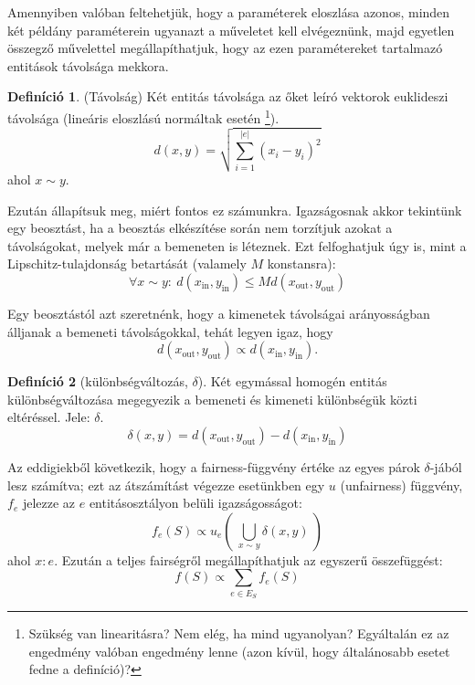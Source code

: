 \documentclass{article}
\theoremstyle{definition}
\newtheorem{definition}{Definíció}[section]
\newcommand{\subin}[1]{ {#1}_{\text{in}} }
\newcommand{\subout}[1]{ {#1}_{\text{out}} }
\begin{document}
\begin{multicols}{2}
    Amennyiben valóban feltehetjük, hogy a paraméterek eloszlása azonos, minden két példány paraméterein ugyanazt a műveletet kell elvégeznünk, majd egyetlen összegző művelettel megállapíthatjuk, hogy az ezen paramétereket tartalmazó entitások távolsága mekkora. 
    
    \begin{definition} (Távolság) \label{def:tavolsag}
        Két entitás távolsága az őket leíró vektorok euklideszi távolsága (lineáris eloszlású normáltak esetén \footnote{Szükség van linearitásra? Nem elég, ha mind ugyanolyan? Egyáltalán ez az engedmény valóban engedmény lenne (azon kívül, hogy általánosabb esetet fedne a definíció)?}).
        \begin{equation}
            d(x, y) = \sqrt{\sum_{i=1}^{|e|} (x_i - y_i)^2 } 
        \end{equation}
        ahol $x \sim y$.
    \end{definition}
    
    Ezután állapítsuk meg, miért fontos ez számunkra. Igazságosnak akkor tekintünk egy beosztást, ha a beosztás elkészítése során nem torzítjuk azokat a távolságokat, melyek már a bemeneten is léteznek. Ezt felfoghatjuk úgy is, mint a Lipschitz-tulajdonság betartását (valamely $M$ konstansra):
    \begin{equation}
        \forall x \sim y : \ d(\subin{x}, \subin{y}) \leq Md(\subout{x}, \subout{y})
    \end{equation}
    
    Egy beosztástól azt szeretnénk, hogy a kimenetek távolságai arányosságban álljanak a bemeneti távolságokkal, tehát legyen igaz, hogy
    \begin{equation}
        d(\subout x, \subout y) \propto d(\subin x, \subin y).
    \end{equation}
    
    \begin{definition}[különbségváltozás, $\delta$]
        Két egymással homogén entitás különbségváltozása megegyezik a bemeneti és kimeneti különbségük közti eltéréssel. Jele: $\delta$.
        \begin{equation}
            \delta(x, y) = d(\subout x, \subout y) - d(\subin x, \subin y)
        \end{equation}
    \end{definition}

    Az eddigiekből következik, hogy a fairness-függvény értéke az egyes párok $\delta$-jából lesz számítva; ezt az átszámítást végezze esetünkben egy $u$ (unfairness) függvény, $f_e$ jelezze az $e$ entitásosztályon belüli igazságosságot:
    \begin{equation}
        f_e(S) \propto u_e\left(\ \bigcup_{x \sim y} \delta(x, y)\ \right)
    \end{equation}
    ahol $x:e$. Ezután a teljes fairségről megállapíthatjuk az egyszerű összefüggést:
    \begin{equation}
        f(S) \propto \sum_{e \in E_S} f_e(S)
    \end{equation}
    

\end{multicols}
\end{document}
